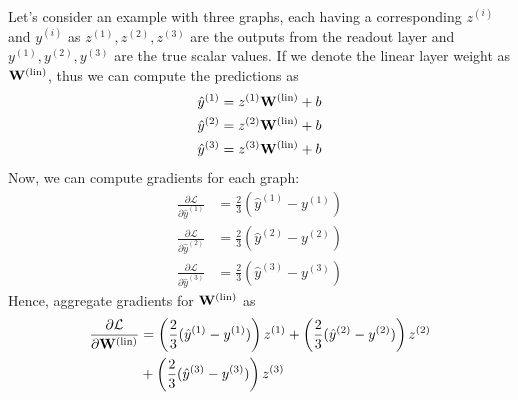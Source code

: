 \documentclass[aps, prd, showpacs, floatfix, superscriptaddress, twocolumn, nofootinbib, preprintnumbers, longbibliography]{revtex4-2}
\begin{document}
Let's consider an example with three graphs, each having a corresponding \(z^{(i)}\) and \(y^{(i)}\) as $z^{(1)}, z^{(2)}, z^{(3)}$ are the outputs from the readout layer and $y^{(1)}, y^{(2)}, y^{(3)}$ are the true scalar values. If we denote the linear layer weight as \({\bf W}^{(\text{lin})}\), thus we can compute the predictions as 
\begin{equation}
 \begin{split}
 \hat{y}^{(1)} &= z^{(1)} {\bf W}^{(\text{lin})} + b \\
 \hat{y}^{(2)} &= z^{(2)} {\bf W}^{(\text{lin})} + b\\
 \hat{y}^{(3)} &= z^{(3)} {\bf W}^{(\text{lin})} + b
 \end{split}
\end{equation}
Now, we can compute gradients for each graph:
\begin{equation}
 \begin{split}
 \frac{\partial \mathcal{L}}{\partial \hat{y}^{(1)}} &= \frac{2}{3} (\hat{y}^{(1)} - y^{(1)}) \\
 \frac{\partial \mathcal{L}}{\partial \hat{y}^{(2)}} &= \frac{2}{3} (\hat{y}^{(2)} - y^{(2)})\\
 \frac{\partial \mathcal{L}}{\partial \hat{y}^{(3)}} &= \frac{2}{3} (\hat{y}^{(3)} - y^{(3)})
 \end{split}
\end{equation}
Hence, aggregate gradients for ${\bf W}^{(\text{lin})}$ as
\begin{equation}\nonumber
 \begin{split}
 \frac{\partial \mathcal{L}}{\partial {\bf W}^{(\text{lin})}} &= \left( \frac{2}{3} (\hat{y}^{(1)} - y^{(1)}) \right) z^{(1)} + \left( \frac{2}{3} (\hat{y}^{(2)} - y^{(2)}) \right) z^{(2)} \\
 &+ \left( \frac{2}{3} (\hat{y}^{(3)} - y^{(3)}) \right) z^{(3)}
 \end{split}
\end{equation}

\end{document}
